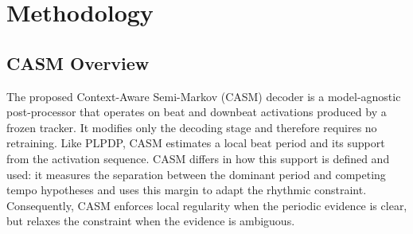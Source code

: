 \documentclass{article}
\begin{document}


\section{Methodology}
\label{sec:method}

\subsection{CASM Overview}
The proposed Context-Aware Semi-Markov (CASM) decoder is a model-agnostic post-processor that operates on beat and downbeat activations produced by a frozen tracker. It modifies only the decoding stage and therefore requires no retraining. Like PLPDP, CASM estimates a local beat period and its support from the activation sequence. CASM differs in how this support is defined and used: it measures the separation between the dominant period and competing tempo hypotheses and uses this margin to adapt the rhythmic constraint. Consequently, CASM enforces local regularity when the periodic evidence is clear, but relaxes the constraint when the evidence is ambiguous.
\end{document}
